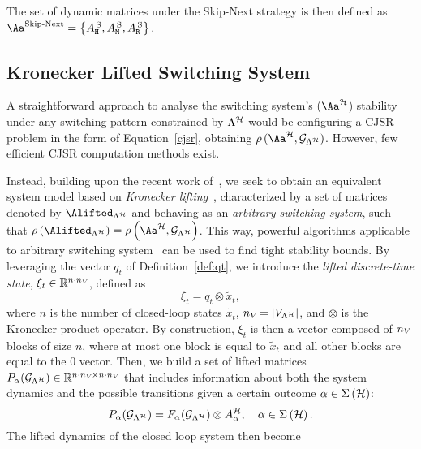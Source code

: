 %
The set of dynamic matrices under the Skip-Next strategy is then defined as $\Aa^{\text{Skip-Next}}=\left\{A^{\,\text{S}}_{\cH},A^{\,\text{S}}_{\cM},A^{\,\text{S}}_{\cR}\right\}$.

\subsection{Kronecker Lifted Switching System}%
\label{sec:system_dynamics}
%
A straightforward approach to analyse the switching system's ($\Aa^\strat$) stability under any switching pattern constrained by $\Lambda^{\mathcal{H}}$ would be configuring a CJSR problem in the form of Equation~\eqref{cjsr}, obtaining $\rho\,(\Aa^\strat,\GG{\Lambda^\strat})$.
However, few efficient CJSR computation methods exist.

Instead, building upon the recent work of~\cite{xu2020approximation}, we seek to obtain an equivalent system model based on \emph{Kronecker lifting}~\cite{horn2012matrix}, characterized by a set of matrices denoted by $\Alifted_{\Lambda^\strat}$ and behaving as an \emph{arbitrary switching system}, such that $\rho\funof{\Alifted_{\Lambda^\strat}} = \rho\funof{\Aa^{\strat},\GG{\Lambda^\strat}}$.
This way, powerful algorithms applicable to arbitrary switching system~\cite{vankeerberghen2014jsr,sparsejsr} can be used to find tight stability bounds.
%
By leveraging the vector $q_t$ of Definition~\ref{def:qt}, we introduce the \emph{lifted discrete-time state}, $\xi_t\in\mathbb{R}^{n\cdot n_{V_{}}}$, defined as 
\begin{equation*}
    \xi_t = q_t\otimes \tilde x_t,
\end{equation*}
where $n$ is the number of closed-loop states $\tilde x_t$, $n_{V_{}} = \left|V_{\Lambda^{\mathcal{H}}}\right|$, and $\otimes$ is the Kronecker product operator.
By construction, $\xi_t$ is then a vector composed of $n_{V_{}}$ blocks of size $n$, where at most one block is equal to $\tilde x_t$ and all other blocks are equal to the $0$ vector.
%
Then, we build a set of lifted matrices $P_{\alpha} ( \mathcal{G}_{\Lambda^{\mathcal{H}}} )\in\mathbb{R}^{n\cdot n_{V_{}}\times n\cdot n_{V_{}}}$ that includes information about both the system dynamics and the possible transitions given a certain outcome $\alpha \in \Sigma\left(\mathcal{H}\right)$:
%
\begin{equation*}
    P_{\alpha} ( \mathcal{G}_{\Lambda^{\mathcal{H}}} ) = F_{\alpha} ( \mathcal{G}_{\Lambda^{\mathcal{H}}} )\otimes A_\alpha^{\mathcal{H}},\quad \alpha \in \Sigma \left( \mathcal{H} \right).
\end{equation*}
%
The lifted dynamics of the closed loop system then become%
